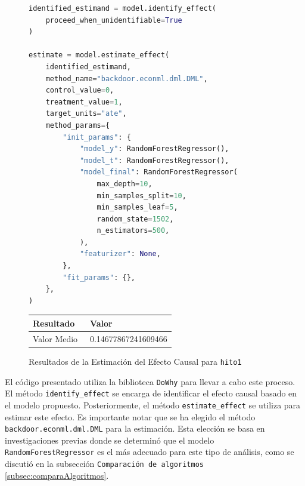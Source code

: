 \begin{figure}[H]
    \centering
    \begin{minipage}{0.5\textwidth}
        \begin{lstlisting}[language=Python, caption=Proceso de Identificación y Estimación del Efecto Causal, label=lst:IdentificarEstimarefectoCausalHito1]
identified_estimand = model.identify_effect(
    proceed_when_unidentifiable=True
)

estimate = model.estimate_effect(
    identified_estimand,
    method_name="backdoor.econml.dml.DML",
    control_value=0,
    treatment_value=1,
    target_units="ate",
    method_params={
        "init_params": {
            "model_y": RandomForestRegressor(),
            "model_t": RandomForestRegressor(),
            "model_final": RandomForestRegressor(
                max_depth=10,
                min_samples_split=10,
                min_samples_leaf=5,
                random_state=1502,
                n_estimators=500,
            ),
            "featurizer": None,
        },
        "fit_params": {},
    },
)
\end{lstlisting}
    \end{minipage}
    \hfill
    \begin{minipage}{0.45\textwidth}
        \centering        
        \begin{tabular}{lp{0.6\linewidth}}
            \toprule
            \textbf{Resultado} & \textbf{Valor} \\
            \midrule
            Valor Medio & 0.14677867241609466 \\
            \bottomrule
        \end{tabular}
        \caption{Resultados de la Estimación del Efecto Causal para \texttt{hito1}}
        \label{tab:efecto_causal_hito1}
    \end{minipage}
\end{figure}

El código presentado utiliza la biblioteca \texttt{DoWhy} para llevar a cabo este proceso. El método \texttt{identify\_effect} se encarga de identificar el efecto causal basado en el modelo propuesto. Posteriormente, el método \texttt{estimate\_effect} se utiliza para estimar este efecto. Es importante notar que se ha elegido el método \texttt{backdoor.econml.dml.DML} para la estimación. Esta elección se basa en investigaciones previas donde se determinó que el modelo \texttt{RandomForestRegressor} es el más adecuado para este tipo de análisis, como se discutió en la subsección \texttt{Comparación de algoritmos} \ref{subsec:comparaAlgoritmos}.

